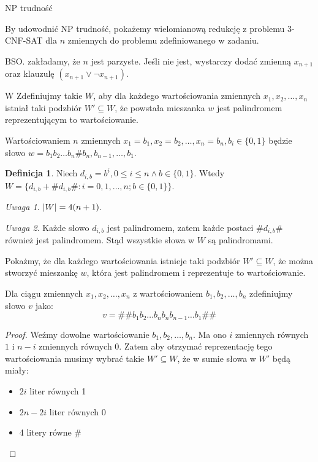 \documentclass{article}
\theoremstyle{definition}
\newtheorem{definition}{Definicja}[section]
\theoremstyle{remark}
\newtheorem{remark}{Uwaga}[section]
\begin{document}
\begin{section}{NP trudność}

By udowodnić NP trudność, pokażemy wielomianową redukcję z problemu 3-CNF-SAT dla $n$ zmiennych do problemu zdefiniowanego w zadaniu.

BSO. zakładamy, że $n$ jest parzyste. Jeśli nie jest, wystarczy dodać zmienną $x_{n+1}$ oraz klauzulę $(x_{n+1} \lor \neg x_{n+1})$.

\begin{subsection}{W}
Zdefiniujmy takie $W$, aby dla każdego wartościowania zmiennych $x_1, x_2, \ldots, x_n$ istniał taki podzbiór $W' \subseteq W$,
 że powstała mieszanka $w$ jest palindromem reprezentującym to wartościowanie.

Wartościowaniem $n$ zmiennych $x_1=b_1, x_2=b_2, \ldots, x_n=b_n, b_i \in \{0,1\}$ będzie słowo $w = b_1 b_2 \ldots b_n \# b_n, b_{n-1}, \ldots, b_1$.

\begin{definition}
Niech $d_{i, b} = b^i, 0 \leq i \leq n \land b \in \{0,1\}$.
Wtedy $W = \{ d_{i, b} + \# d_{i, b} \#: i = 0, 1, \ldots, n;  b \in \{0,1\} \}$.

\begin{remark}
$\abs{W} = 4(n+1)$.
\end{remark}

\begin{remark}
Każde słowo $d_{i,b}$ jest palindromem, zatem każde postaci $ \# d_{i,b} \#$ również jest palindromem.
Stąd wszystkie słowa w $W$ są palindromami.
\end{remark}

\end{definition}

Pokażmy, że dla każdego wartościowania istnieje taki podzbiór $W' \subseteq W$, że można stworzyć mieszankę $w$, która jest palindromem i reprezentuje to wartościowanie.

Dla ciągu zmiennych $x_1, x_2, \ldots, x_n$ z wartościowaniem $b_1, b_2, \ldots, b_n$ zdefiniujmy słowo $v$ jako:
\[
v = \# \# b_1 b_2 \ldots b_n b_n b_{n-1} \ldots b_1 \# \#
\]
\begin{proof}
Weźmy dowolne wartościowanie $b_1, b_2, \ldots, b_n$. Ma ono $i$ zmiennych równych $1$ i $n-i$ zmiennych równych $0$.
Zatem aby otrzymać reprezentację tego wartościowania musimy wybrać takie \(W' \subseteq W\), że w sumie słowa w \(W'\) będą miały:
\begin{itemize}
    \item $2i$ liter równych 1
    \item $2n - 2i$ liter równych 0
    \item 4 litery równe $\#$
\end{itemize}


\end{proof}
\end{subsection}
\end{section}
\end{document}
